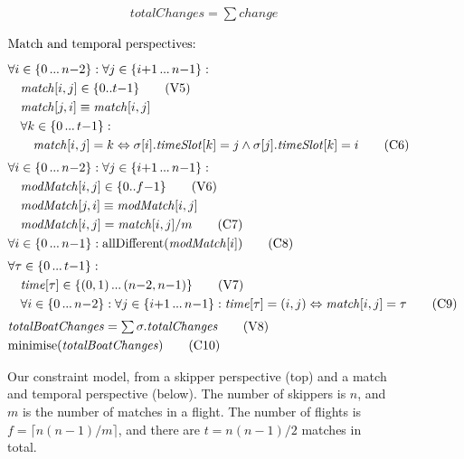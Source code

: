 \documentclass{llncs}
\newcommand{\match}{\mathit{match}}
\newcommand{\timeSlot}{\mathit{timeSlot}}
\newcommand{\change}{\mathit{change}}
\newcommand{\totalChanges}{\mathit{totalChanges}}
\newcommand{\totalBoatChanges}{\mathit{totalBoatChanges}}
\newcommand{\modMatch}{\mathit{modMatch}}
\newcommand{\timeVar}{\mathit{time}}
\newcommand{\allDifferent}{\mathrm{allDifferent}}
\newcommand{\minimise}{\mathrm{minimise}}
\newcommand\nldots{\,\hbox to 0.8em{.\hss.\hss.}\,}
\begin{document}
\begin{figure}[p]
\begin{framed}
\begin{align}
    & \totalChanges = \textstyle\sum \change \label{C5} \tag{C5}
\end{align}
\end{framed}\begin{framed}
\begin{align}
    \intertext{Match and temporal perspectives:\smallskip}
    & \forall i \in \{0 \nldots n{-}2\} : \forall j \in \{ i{+}1 \nldots n{-}1 \} : \nonumber \\
    & \hspace*{1em} \match[{i,j}] \in \{0..t{-}1\} \tag{V5} \label{V5} \\
    & \hspace*{1em} \match[{j,i}] \equiv \match[{i,j}] \nonumber \\
    & \hspace*{1em} \forall k \in \{0 \nldots t{-}1 \} : \nonumber \\
    & \hspace*{2em} \match[{i,j}] = k \Leftrightarrow \sigma[{i}].\timeSlot[{k}] = j \wedge \sigma[{j}].\timeSlot[{k}] = i \tag{C6} \label{C6} \\[0.1cm]
    & \forall i \in \{0 \nldots n{-}2\} : \forall j \in \{ i{+}1 \nldots n{-}1 \} \nonumber : \\
    & \hspace*{1em} \modMatch[{i,j}] \in \{0..f{-}1\} \label{V6} \tag{V6} \\
    & \hspace*{1em} \modMatch[{j,i}] \equiv \modMatch[{i,j}] \nonumber  \\
    & \hspace*{1em} \modMatch[{i,j}] = \match[{i,j}] / m \tag{C7} \label{C7} \\
    & \forall i \in \{0 \nldots n{-}1 \} : \allDifferent(\modMatch[{i}]) \tag{C8} \label{C8} \\[0.1cm]
    & \forall \tau \in \{0 \nldots t{-}1 \} : \nonumber \\
    & \hspace*{1em} \timeVar[{\tau}] \in \{(0,1) \nldots (n{-}2,n{-}1)\} \tag{V7} \label{V7} \\
    & \hspace*{1em} \forall i \in \{0 \nldots n{-}2\} : \forall  j \in \{ i{+}1 \nldots n{-}1 \} : \timeVar[{\tau}] = (i,j) \Leftrightarrow \match[{i,j}] = \tau \tag{C9} \label{C9} \\[0.1cm]
    & \totalBoatChanges = \textstyle\sum \sigma.\totalChanges \label{V8} \tag{V8} \\
    & \minimise(\totalBoatChanges) \label{C10} \tag{C10}
\end{align}
\end{framed}
\caption{Our constraint model, from a skipper perspective (top) and a match and temporal perspective
(below). The number of skippers is $n$, and $m$ is the number of matches in a flight. The number of
flights is $f = \lceil n(n-1)/m \rceil$, and there are $t = n(n-1)/2$ matches in
total.}\label{model:stage1}
\end{figure}
\end{document}
